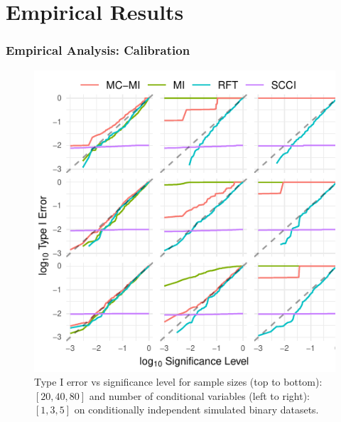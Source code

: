 \documentclass{beamer}
\begin{document}
\section{Empirical Results}

\begin{frame}
	\frametitle{Empirical Analysis: Calibration}
	\begin{figure}
		\centering
		\includegraphics[scale=0.8]{imgs/calibration_add_vars.pdf}
		\caption*{Type I error vs significance level for sample sizes (top to
		bottom): $ [20, 40, 80] $ and number of conditional variables (left to
		right): $ [1, 3, 5] $ on conditionally independent simulated binary
		datasets.}
	\end{figure}
\end{frame}
\end{document}
